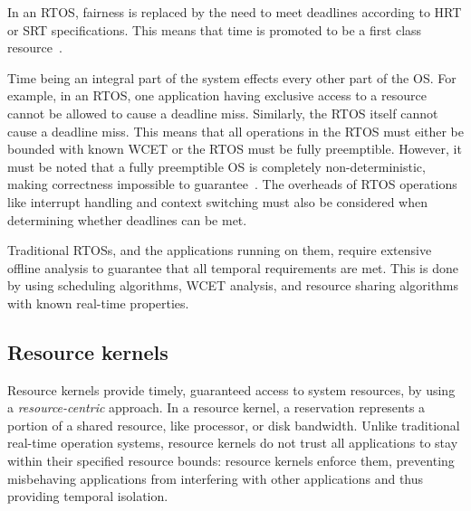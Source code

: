  In an \gls{RTOS}, fairness is replaced by the need to meet deadlines according to \gls{HRT} or \gls{SRT} specifications.
 This means that time is promoted to be a first class resource~\citep{Stankovic_1988}.

Time being an integral part of the system effects every other part of the \gls{OS}.
For example, in an \gls{RTOS}, one application having exclusive access to a resource cannot be allowed to cause a deadline miss.
Similarly, the \gls{RTOS} itself cannot cause a deadline miss.
This means that all operations in the \gls{RTOS} must either be bounded with known {\gls{WCET}} or the \gls{RTOS} must be fully preemptible.
However, it must be noted that a fully preemptible \gls{OS} is completely non-deterministic, making correctness impossible to guarantee~\citep{Blackham_TH_12}.
 The overheads of \gls{RTOS} operations like interrupt handling and context switching must also be considered when determining whether deadlines can be met.

Traditional \glspl{RTOS}, and the applications running on them, require extensive offline analysis to guarantee that all temporal requirements are met.
This is done by using scheduling algorithms, \gls{WCET} analysis, and resource sharing algorithms with known real-time properties.

\subsection{Resource kernels}
\label{sec:resource-kernels}

Resource kernels provide timely, guaranteed access to system resources, by using a \emph{resource-centric} approach.
In a resource kernel, a reservation represents a portion of a shared resource, like processor, or disk bandwidth.
Unlike traditional real-time operation systems, resource kernels do not trust all applications to stay within their specified resource bounds: resource kernels enforce them, preventing misbehaving applications from interfering with other applications and thus providing temporal isolation.

